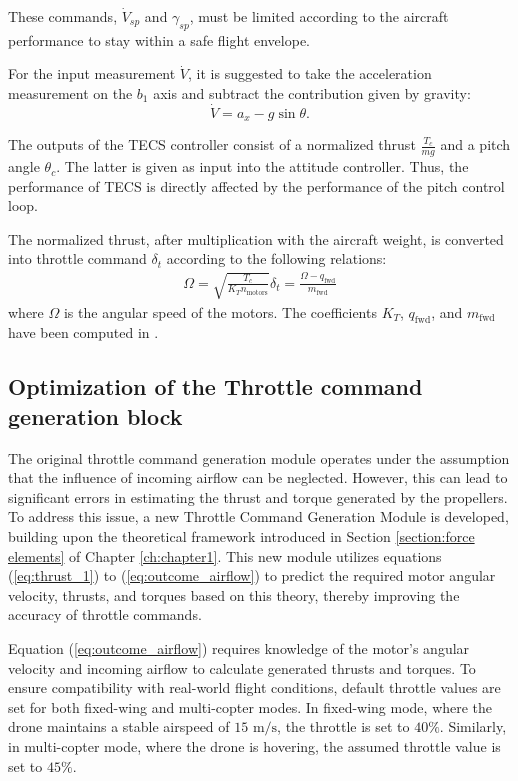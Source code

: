 These commands, \( \dot{V}_{sp} \) and \( \gamma_{sp} \), must be limited according to the aircraft performance to stay within a safe flight envelope.

For the input measurement \( \dot{V} \), it is suggested \cite{fari2017guidance} to take the acceleration measurement on the \( b_1 \) axis and subtract the contribution given by gravity:
\begin{equation}
    \dot{V} = a_x - g \sin \theta.
\end{equation}

The outputs of the TECS controller consist of a normalized thrust \( \frac{{T_c}}{{mg}} \) and a pitch angle \( \theta_c \). The latter is given as input into the attitude controller. Thus, the performance of TECS is directly affected by the performance of the pitch control loop.

The normalized thrust, after multiplication with the aircraft weight, is converted into throttle command \( \delta_t \) according to the following relations:
\begin{align}
    \Omega = \sqrt{\frac{{T_c}}{{K_T n_{\text{motors}}}}}
    \delta_t = \frac{{\Omega - q_{\text{fwd}}}}{{m_{\text{fwd}}}}
\end{align}
where \( \Omega \) is the angular speed of the motors. The coefficients \( K_T \), \( q_{\text{fwd}} \), and \( m_{\text{fwd}} \) have been computed in \cite{martello2021}.

\subsection{Optimization of the Throttle command generation block}
The original throttle command generation module operates under the assumption that the influence of incoming airflow can be neglected. However, this can lead to significant errors in estimating the thrust and torque generated by the propellers. To address this issue, a new Throttle Command Generation Module is developed, building upon the theoretical framework introduced in Section \ref{section:force elements} of Chapter \ref{ch:chapter1}. This new module utilizes equations (\ref{eq:thrust_1}) to (\ref{eq:outcome_airflow}) to predict the required motor angular velocity, thrusts, and torques based on this theory, thereby improving the accuracy of throttle commands.

Equation (\ref{eq:outcome_airflow}) requires knowledge of the motor's angular velocity and incoming airflow to calculate generated thrusts and torques. To ensure compatibility with real-world flight conditions, default throttle values are set for both fixed-wing and multi-copter modes. In fixed-wing mode, where the drone maintains a stable airspeed of $15 \text{ m/s}$, the throttle is set to $40\%$. Similarly, in multi-copter mode, where the drone is hovering, the assumed throttle value is set to $45\%$.


